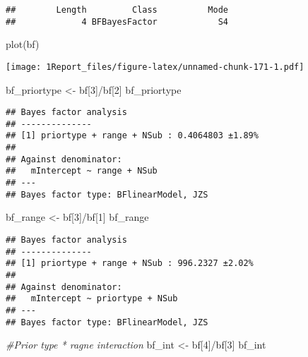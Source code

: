 \documentclass[
]{article}
\newenvironment{Shaded}{\begin{snugshade}}{\end{snugshade}}
\newcommand{\CommentTok}[1]{\textcolor[rgb]{0.56,0.35,0.01}{\textit{#1}}}
\newcommand{\DecValTok}[1]{\textcolor[rgb]{0.00,0.00,0.81}{#1}}
\newcommand{\FunctionTok}[1]{\textcolor[rgb]{0.00,0.00,0.00}{#1}}
\newcommand{\NormalTok}[1]{#1}
\newcommand{\OtherTok}[1]{\textcolor[rgb]{0.56,0.35,0.01}{#1}}
\newcommand{\SpecialCharTok}[1]{\textcolor[rgb]{0.00,0.00,0.00}{#1}}
\begin{document}
\begin{verbatim}
##        Length         Class          Mode 
##             4 BFBayesFactor            S4
\end{verbatim}

\begin{Shaded}
\begin{Highlighting}[]
\FunctionTok{plot}\NormalTok{(bf)}
\end{Highlighting}
\end{Shaded}

\texttt{[image: 1Report\_files/figure-latex/unnamed-chunk-171-1.pdf]}

\begin{Shaded}
\begin{Highlighting}[]
\NormalTok{ bf\_priortype }\OtherTok{\textless{}{-}}\NormalTok{ bf[}\DecValTok{3}\NormalTok{]}\SpecialCharTok{/}\NormalTok{bf[}\DecValTok{2}\NormalTok{]}
\NormalTok{ bf\_priortype}
\end{Highlighting}
\end{Shaded}

\begin{verbatim}
## Bayes factor analysis
## --------------
## [1] priortype + range + NSub : 0.4064803 ±1.89%
## 
## Against denominator:
##   mIntercept ~ range + NSub 
## ---
## Bayes factor type: BFlinearModel, JZS
\end{verbatim}

\begin{Shaded}
\begin{Highlighting}[]
\NormalTok{bf\_range }\OtherTok{\textless{}{-}}\NormalTok{ bf[}\DecValTok{3}\NormalTok{]}\SpecialCharTok{/}\NormalTok{bf[}\DecValTok{1}\NormalTok{]}
\NormalTok{bf\_range}
\end{Highlighting}
\end{Shaded}

\begin{verbatim}
## Bayes factor analysis
## --------------
## [1] priortype + range + NSub : 996.2327 ±2.02%
## 
## Against denominator:
##   mIntercept ~ priortype + NSub 
## ---
## Bayes factor type: BFlinearModel, JZS
\end{verbatim}

\begin{Shaded}
\begin{Highlighting}[]
\CommentTok{\#Prior type * ragne interaction }
\NormalTok{bf\_int }\OtherTok{\textless{}{-}}\NormalTok{ bf[}\DecValTok{4}\NormalTok{]}\SpecialCharTok{/}\NormalTok{bf[}\DecValTok{3}\NormalTok{] }
\NormalTok{bf\_int}
\end{Highlighting}
\end{Shaded}
\end{document}

